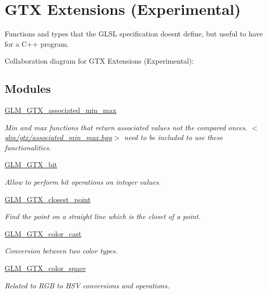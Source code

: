 \hypertarget{group__gtx}{}\section{G\+T\+X Extensions (Experimental)}
\label{group__gtx}


Functions and types that the G\+L\+S\+L specification doesn\textquotesingle{}t define, but useful to have for a C++ program.  


Collaboration diagram for G\+T\+X Extensions (Experimental)\+:
\subsection*{Modules}
\begin{DoxyCompactItemize}
\item 
\hyperlink{group__gtx__associated__min__max}{G\+L\+M\+\_\+\+G\+T\+X\+\_\+associated\+\_\+min\+\_\+max}
\begin{DoxyCompactList}\small\item\em Min and max functions that return associated values not the compared onces. $<$\hyperlink{associated__min__max_8hpp}{glm/gtx/associated\+\_\+min\+\_\+max.\+hpp}$>$ need to be included to use these functionalities. \end{DoxyCompactList}\item 
\hyperlink{group__gtx__bit}{G\+L\+M\+\_\+\+G\+T\+X\+\_\+bit}
\begin{DoxyCompactList}\small\item\em Allow to perform bit operations on integer values. \end{DoxyCompactList}\item 
\hyperlink{group__gtx__closest__point}{G\+L\+M\+\_\+\+G\+T\+X\+\_\+closest\+\_\+point}
\begin{DoxyCompactList}\small\item\em Find the point on a straight line which is the closet of a point. \end{DoxyCompactList}\item 
\hyperlink{group__gtx__color__cast}{G\+L\+M\+\_\+\+G\+T\+X\+\_\+color\+\_\+cast}
\begin{DoxyCompactList}\small\item\em Conversion between two color types. \end{DoxyCompactList}\item 
\hyperlink{group__gtx__color__space}{G\+L\+M\+\_\+\+G\+T\+X\+\_\+color\+\_\+space}
\begin{DoxyCompactList}\small\item\em Related to R\+G\+B to H\+S\+V conversions and operations. \end{DoxyCompactList}\item 

\end{DoxyCompactItemize}
